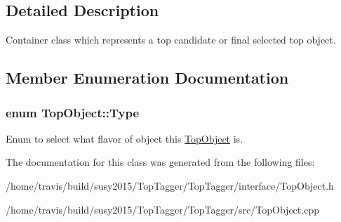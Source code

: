 \subsection{Detailed Description}
Container class which represents a top candidate or final selected top object. 

\subsection{Member Enumeration Documentation}
\hypertarget{classTopObject_af82a20e421c29bc667af7cd73fc46ba4}{
\subsubsection[{Type}]{\setlength{\rightskip}{0pt plus 5cm}enum {\bf Top\-Object\-::\-Type}}}\label{classTopObject_af82a20e421c29bc667af7cd73fc46ba4}
Enum to select what flavor of object this \hyperlink{classTopObject}{Top\-Object} is. 

The documentation for this class was generated from the following files\-:\begin{DoxyCompactItemize}
\item 
/home/travis/build/susy2015/\-Top\-Tagger/\-Top\-Tagger/interface/Top\-Object.\-h\item 
/home/travis/build/susy2015/\-Top\-Tagger/\-Top\-Tagger/src/Top\-Object.\-cpp\end{DoxyCompactItemize}
